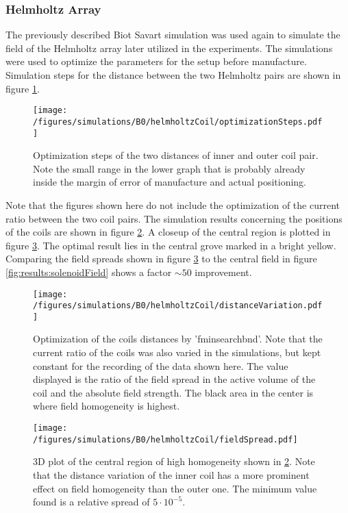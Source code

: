         \subsubsection{Helmholtz Array}
        The previously described Biot Savart simulation was used again to simulate the field of the Helmholtz array later utilized in the experiments. The simulations were used to optimize the parameters for the setup before manufacture. Simulation steps for the distance between the two Helmholtz pairs are shown in figure \ref{fig:results:optimizationSteps}.
        \begin{figure}
            \centering
            \texttt{[image: /figures/simulations/B0/helmholtzCoil/optimizationSteps.pdf]}
            \caption[Helmholtz coil optimization]{Optimization steps of the two distances of inner and outer coil pair. Note the small range in the lower graph that is probably already inside the margin of error of manufacture and actual positioning.}
            \label{fig:results:optimizationSteps}
        \end{figure}
        Note that the figures shown here do not include the optimization of the current ratio between the two coil pairs. The simulation results concerning the positions of the coils are shown in figure \ref{fig:results:distanceVariation}. A closeup of the central region is plotted in figure \ref{fig:results:fieldSpread}. The optimal result lies in the central grove marked in a bright yellow. Comparing the field spreads shown in figure \ref{fig:results:fieldSpread} to the central field in figure \ref{fig:results:solenoidField} shows a factor $\sim 50$ improvement.
        \begin{figure}
           \centering
           \texttt{[image: /figures/simulations/B0/helmholtzCoil/distanceVariation.pdf]}
           \caption[Optimization steps]{Optimization of the coils distances by 'fminsearchbnd'. Note that the current ratio of the coils was also varied in the simulations, but kept constant for the recording of the data shown here. The value displayed is the ratio of the field spread in the active volume of the coil and the absolute field strength. The black area in the center is where field homogeneity is highest.}
           \label{fig:results:distanceVariation}
        \end{figure}
        \begin{figure}
            \texttt{[image: /figures/simulations/B0/helmholtzCoil/fieldSpread.pdf]}
            \caption[Distance variation homogeniety]{3D plot of the central region of high homogeneity shown in \ref{fig:results:distanceVariation}. Note that the distance variation of the inner coil has a more prominent effect on field homogeneity than the outer one. The minimum value found is a relative spread of $5\cdot 10^{-5}$.}
            \label{fig:results:fieldSpread}
        \end{figure}
